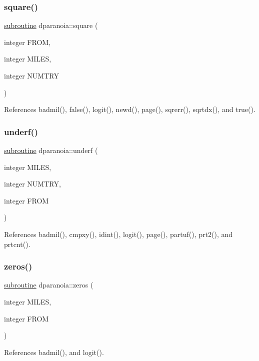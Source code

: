 \mbox{\label{dparanoia_8f90_a3df535611e179b371692d3389d67f55e}} 
\subsubsection{\texorpdfstring{square()}{square()}}
{\footnotesize\ttfamily \hyperlink{M__stopwatch_83_8txt_acfbcff50169d691ff02d4a123ed70482}{subroutine} dparanoia\+::square (\begin{DoxyParamCaption}\item[{integer}]{F\+R\+OM,  }\item[{integer}]{M\+I\+L\+ES,  }\item[{integer}]{N\+U\+M\+T\+RY }\end{DoxyParamCaption})}



References badmil(), false(), logit(), newd(), page(), sqrerr(), sqrtdx(), and true().

\mbox{\label{dparanoia_8f90_aa99be2fbd962a1d98b5066c736157b46}} 
\subsubsection{\texorpdfstring{underf()}{underf()}}
{\footnotesize\ttfamily \hyperlink{M__stopwatch_83_8txt_acfbcff50169d691ff02d4a123ed70482}{subroutine} dparanoia\+::underf (\begin{DoxyParamCaption}\item[{integer}]{M\+I\+L\+ES,  }\item[{integer}]{N\+U\+M\+T\+RY,  }\item[{integer}]{F\+R\+OM }\end{DoxyParamCaption})}



References badmil(), cmpxy(), idint(), logit(), page(), partuf(), prt2(), and prtcnt().

\mbox{\label{dparanoia_8f90_aa950201dedb2112e97b67e9fae35f88e}} 
\subsubsection{\texorpdfstring{zeros()}{zeros()}}
{\footnotesize\ttfamily \hyperlink{M__stopwatch_83_8txt_acfbcff50169d691ff02d4a123ed70482}{subroutine} dparanoia\+::zeros (\begin{DoxyParamCaption}\item[{integer}]{M\+I\+L\+ES,  }\item[{integer}]{F\+R\+OM }\end{DoxyParamCaption})}



References badmil(), and logit().

